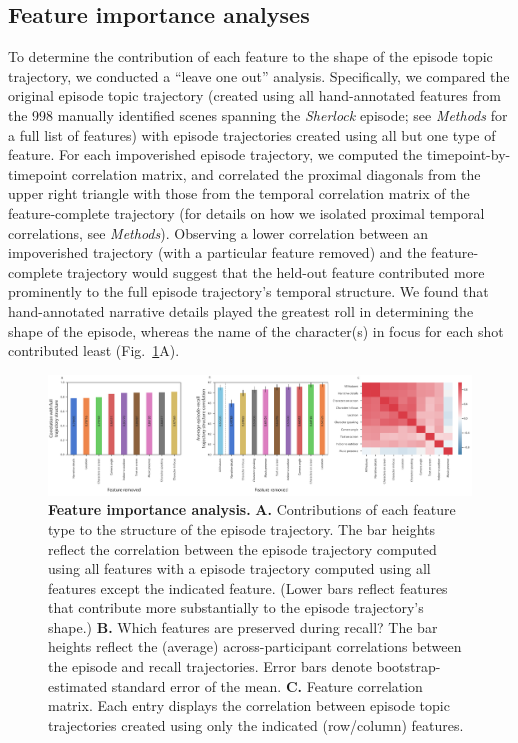 \documentclass{article}
\begin{document}
\subsection*{Feature importance analyses}
To determine the contribution of each feature to the shape of the episode topic trajectory, we conducted a ``leave one out'' analysis.  Specifically, we compared the original episode topic trajectory (created using all hand-annotated features from the 998 manually identified scenes spanning the \textit{Sherlock} episode; see \textit{Methods} for a full list of features) with episode trajectories created using all but one type of feature.  For each impoverished episode trajectory, we computed the timepoint-by-timepoint correlation matrix, and correlated the proximal diagonals from the upper right triangle with those from the temporal correlation matrix of the feature-complete trajectory (for details on how we isolated proximal temporal correlations, see \textit{Methods}).  Observing a lower correlation between an impoverished trajectory (with a particular feature removed) and the feature-complete trajectory would suggest that the held-out feature contributed more prominently to the full episode trajectory's temporal structure.  We found that hand-annotated narrative details played the greatest roll in determining the shape of the episode, whereas the name of the character(s) in focus for each shot contributed least (Fig.~\ref{fig:feature-importance}A).

\begin{figure}[]
\centering
\includegraphics[width=1\textwidth]{figs/feature_value}
\caption{\small \textbf{Feature importance analysis.} \textbf{A.} Contributions of each feature type to the structure of the episode trajectory. The bar heights reflect the correlation between the episode trajectory computed using all features with a episode trajectory computed using all features except the indicated feature.  (Lower bars reflect features that contribute more substantially to the episode trajectory's shape.) \textbf{B.} Which features are preserved during recall?  The bar heights reflect the (average) across-participant correlations between the episode and recall trajectories.  Error bars denote bootstrap-estimated standard error of the mean.  \textbf{C.} Feature correlation matrix.  Each entry displays the correlation between episode topic trajectories created using only the indicated (row/column) features.}
\label{fig:feature-importance}
\end{figure}
\end{document}
